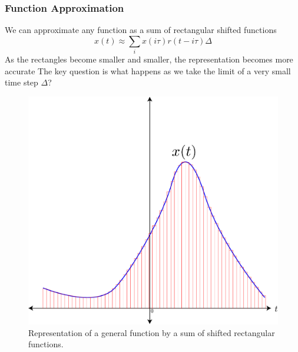 \subsubsection{Function Approximation}
We can approximate any function as a sum of rectangular shifted functions
    \begin{equation}
        x(t) \approx \sum_i x(i\tau) r(t - i\tau) \Delta
    \end{equation}
 As the rectangles become smaller and smaller, the representation becomes more accurate
 The key question is what happens as we take the limit of a very small time step $\Delta$?
\begin{figure}[tb]
\centering
\includegraphics[width=.55\columnwidth]{func_rect}
\caption{Representation of a general function by a sum of shifted rectangular functions. }
\label{fig:func_rect}
\end{figure}
